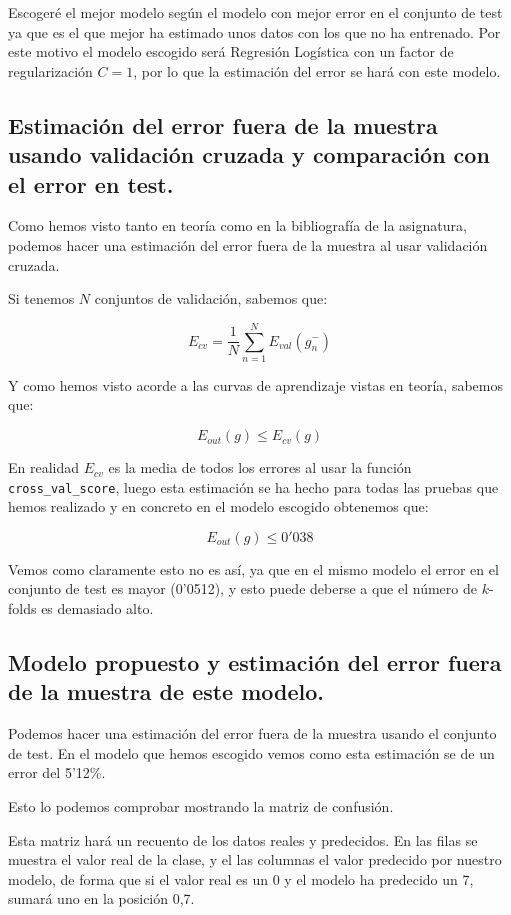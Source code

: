\documentclass[12pt, spanish]{article}
\begin{document}
Escogeré el mejor modelo según el modelo con mejor error en el conjunto de test ya que es el que mejor ha estimado unos datos con los que no ha entrenado. Por este motivo el modelo escogido será Regresión Logística con un factor de regularización $C=1$, por lo que la estimación del error se hará con este modelo.

\newpage

\subsection{Estimación del error fuera de la muestra usando validación cruzada y comparación con el error en test.}

Como hemos visto tanto en teoría\cite{teoria} como en la bibliografía de la asignatura\cite{libro}, podemos hacer una estimación del error fuera de la muestra al usar validación cruzada.

Si tenemos $N$ conjuntos de validación, sabemos que:

$$E_{cv} = \frac{1}{N}\sum_{n=1}^{N}{E_{val}(g_n^-)}$$

Y como hemos visto acorde a las curvas de aprendizaje vistas en teoría, sabemos que:

$$E_{out}(g) \leq E_{cv}(g) $$

En realidad $E_{cv}$ es la media de todos los errores al usar la función \texttt{cross\_val\_score}, luego esta estimación se ha hecho para todas las pruebas que hemos realizado y en concreto en el modelo escogido obtenemos que:

$$  E_{out}(g) \leq 0'038$$

Vemos como claramente esto no es así, ya que en el mismo modelo el error en el conjunto de test es mayor (0'0512), y esto puede deberse a que el número de $k$-folds es demasiado alto.




\subsection{Modelo propuesto y estimación del error fuera de la muestra de este modelo.}

Podemos hacer una estimación del error fuera de la muestra usando el conjunto de test. En el modelo que hemos escogido vemos como esta estimación se de un error del 5'12\%.

Esto lo podemos comprobar mostrando la matriz de confusión.

Esta matriz hará un recuento de los datos reales y predecidos. En las filas se muestra el valor real de la clase, y el las columnas el valor predecido por nuestro modelo, de forma que si el valor real es un 0 y el modelo ha predecido un 7, sumará uno en la posición 0,7. 
\end{document}
